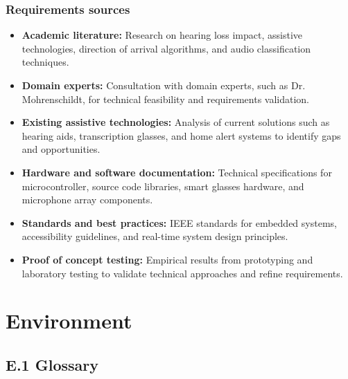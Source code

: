 \documentclass[12pt]{article}
\theoremstyle{definition}
\begin{document}
\subsubsection{Requirements sources}

\begin{itemize}
\item \textbf{Academic literature:} Research on hearing loss impact,
assistive technologies, direction of arrival algorithms, and audio
classification techniques.

\item \textbf{Domain experts:}\label{itm:domain-experts} Consultation with domain experts, such as 
Dr. Mohrenschildt, for technical feasibility and requirements validation.

\item \textbf{Existing assistive technologies:} Analysis of current solutions
such as hearing aids, transcription glasses, and home alert systems to
identify gaps and opportunities.

\item \textbf{Hardware and software documentation:} Technical specifications
for microcontroller, source code libraries, smart glasses hardware,
and microphone array components.

\item \textbf{Standards and best practices:} IEEE standards for embedded
systems, accessibility guidelines, and real-time system design principles.

\item \textbf{Proof of concept testing:} Empirical results from prototyping
and laboratory testing to validate technical approaches and refine
requirements.
\end{itemize}


\section{Environment}

\subsection{E.1 Glossary}
\end{document}
